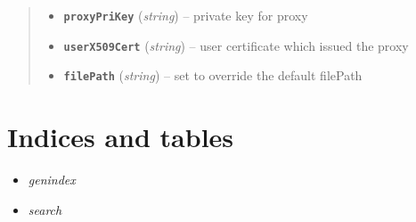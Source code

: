 \documentclass[letterpaper,10pt,english]{sphinxmanual}
\begin{document}
\begin{fulllineitems}
\begin{fulllineitems}
\begin{quote}
\begin{description}
\begin{itemize}
\item {} 
\textbf{\texttt{proxyPriKey}} (\emph{string}) -- private key for proxy

\item {} 
\textbf{\texttt{userX509Cert}} (\emph{string}) -- user certificate which issued the proxy

\item {} 
\textbf{\texttt{filePath}} (\emph{string}) -- set to override the default filePath

\end{itemize}

\end{description}\end{quote}

\end{fulllineitems}


\end{fulllineitems}



\chapter{Indices and tables}
\label{index:indices-and-tables}\begin{itemize}
\item {} 
\emph{genindex}

\item {} 
\emph{search}

\end{itemize}



\renewcommand{\indexname}{Index}
\printindex
\end{document}
